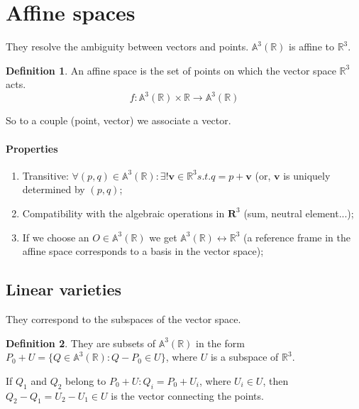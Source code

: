 \documentclass[12pt,a4paper]{report}
\numberwithin{equation}{section}
\theoremstyle{definition}
\newtheorem{definition}{Definition}[section]
\theoremstyle{remark}
\begin{document}
\section{Affine spaces}

They resolve the ambiguity between vectors and points. $\mathbb{A}^3 (\mathbb{R})$ is affine to $\mathbb{R}^3$.

\begin{definition}
An affine space is the set of points on which the vector space $\mathbb{R}^3$ acts.
\begin{equation}
f: \mathbb{A}^3 (\mathbb{R}) \times \mathbb{R} \rightarrow \mathbb{A}^3 (\mathbb{R})
\end{equation}

So to a couple (point, vector) we associate a vector.
\end{definition}

\paragraph{Properties}

\begin{enumerate}
\item Transitive: $\forall (p, q) \in \mathbb{A}^3 (\mathbb{R}): \exists ! \mathbf{v} \in \mathbb{R}^3 s.t. q = p+\mathbf{v}$ (or, $\mathbf{v}$ is uniquely determined by $(p, q)$;
\item Compatibility with the algebraic operations in $\mathbf{R}^3$ (sum, neutral element...);
\item If we choose an $O \in \mathbb{A}^3 (\mathbb{R})$ we get $\mathbb{A}^3 (\mathbb{R}) \leftrightarrow \mathbb{R}^3$ (a reference frame in the affine space corresponds to a basis in the vector space);
\end{enumerate}

\subsection{Linear varieties}

They correspond to the subspaces of the vector space. 

\begin{definition}
They are subsets of $\mathbb{A}^3 (\mathbb{R})$ in the form $P_0 + U = \lbrace Q \in \mathbb{A}^3 (\mathbb{R}) : Q-P_0 \in U\rbrace$, where $U$ is a subspace of $\mathbb{R}^3$.
\end{definition}

If $Q_1$ and $Q_2$ belong to $P_0 + U: Q_i = P_0 + U_i$, where $U_i \in U$, then $Q_2-Q_1 = U_2 - U_1 \in U$ is the vector connecting the points.
\end{document}
